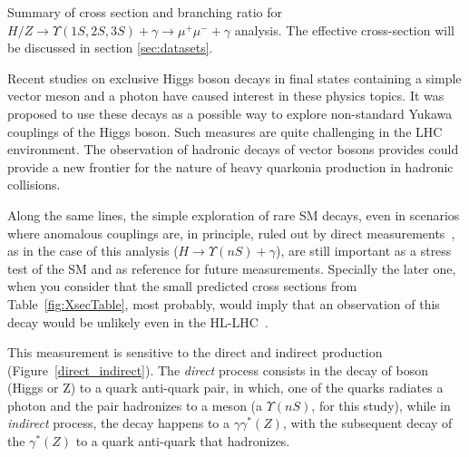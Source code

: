 \begin{table}[htp]
  \begin{center}
    \caption{Summary of cross section and branching ratio for $H/Z \rightarrow \Upsilon(1S,2S,3S)+\gamma  \rightarrow \mu^{+} \mu^{-} +\gamma$ analysis. The effective cross-section will be discussed in section \ref{sec:datasets}.}
    
    \label{fig:XsecTable}
  \end{center}
\end{table}






Recent studies on exclusive Higgs boson decays \cite{ISIDORI2014131,PhysRevLett.114.101802,GAO2014366} in final states containing a simple vector meson and a photon have caused interest in these physics topics. It was proposed to use these decays as a possible way to explore non-standard Yukawa couplings of the Higgs boson. Such measures are quite challenging in the LHC environment. The observation of hadronic decays of vector bosons provides could provide a new frontier for the nature of heavy quarkonia production in hadronic collisions.

Along the same lines, the simple exploration of rare SM decays, even in scenarios where anomalous couplings are, in principle, ruled out by direct measurements~\cite{cms_h_to_bb_PhysRevLett.121.121801}, as in the case of this analysis ($H \rightarrow \Upsilon(nS) + \gamma$), are still important as a stress test of the SM and as reference for future measurements. Specially the later one, when you consider that the small predicted cross sections from Table~\ref{fig:XsecTable}, most probably, would imply that an observation of this decay would be unlikely even in the HL-LHC~\cite{hl_lhc}.

This measurement is sensitive to the direct and indirect production (Figure~\ref{direct_indirect}). The \textit{direct} process consists in the decay of boson (Higgs or Z) to a quark anti-quark pair, in which, one of the quarks radiates a photon and the pair hadronizes to a meson (a $\Upsilon(nS)$, for this study), while in \textit{indirect} process, the decay happens to a $\gamma \gamma^{*}(Z)$, with the subsequent decay of the $\gamma^{*}(Z)$ to a quark anti-quark that hadronizes. 


